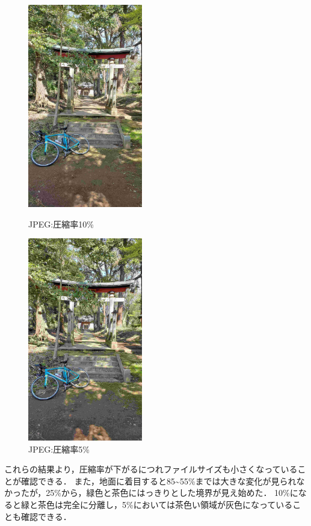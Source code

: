 \documentclass[a4paper,11pt]{bxjsarticle}
\begin{document}
  \begin{figure}[htbp]
    \begin{minipage}{0.5\hsize}
     \begin{center}
      \includegraphics[width=50mm]{sample_j10.jpg}
     \end{center}
     \caption{JPEG:圧縮率10\%}
     \label{fig:j10}
    \end{minipage}
    \begin{minipage}{0.5\hsize}
     \begin{center}
      \includegraphics[width=50mm]{sample_j5.jpg}
     \end{center}
     \caption{JPEG:圧縮率5\%}
     \label{fig:j5}
    \end{minipage}
   \end{figure}
\newpage

これらの結果より，圧縮率が下がるにつれファイルサイズも小さくなっていることが確認できる．
また，地面に着目すると85\textasciitilde55\%までは大きな変化が見られなかったが，25\%から，緑色と茶色にはっきりとした境界が見え始めた．
10\%になると緑と茶色は完全に分離し，5\%においては茶色い領域が灰色になっていることも確認できる．
\end{document}
